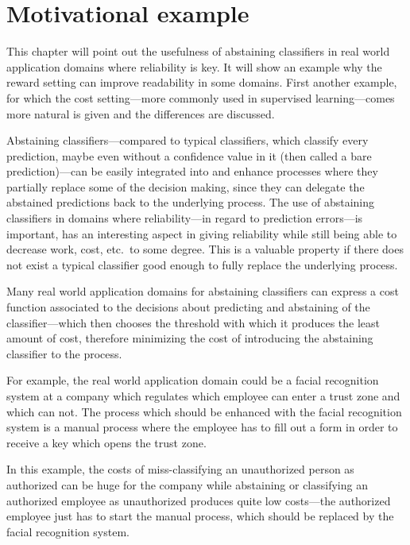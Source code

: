 \documentclass[twoside,11pt]{article}
\begin{document}
\section{Motivational example}
\label{sec:example}

This chapter will point out the usefulness of abstaining
classifiers in real world application domains where
reliability is key.
It will show an example why the reward setting can improve
readability in some domains.
First another example, for which the cost setting---more
commonly used in supervised learning---comes more natural
is given and the differences are discussed.

Abstaining classifiers---compared to typical classifiers,
which classify every prediction, maybe even without a
confidence value in it (then called a bare
prediction)---can be easily integrated into and enhance
processes where they partially replace some of the decision
making, since they can delegate the abstained predictions
back to the underlying process.
The use of abstaining classifiers in domains where
reliability---in regard to prediction errors---is
important, has an interesting aspect in giving
reliability while still being able to decrease work, cost,
etc.\ to some degree.
This is a valuable property if there does not exist a
typical classifier good enough to fully replace the
underlying process.

Many real world application domains for abstaining
classifiers can express a cost function associated to the
decisions about predicting and abstaining of the
classifier---which then chooses the threshold with which it
produces the least amount of cost, therefore minimizing
the cost of introducing the abstaining classifier to the
process.

For example, the real world application domain could be a
facial recognition system at a company which regulates
which employee can enter a trust zone and which can not.
The process which should be enhanced with the facial
recognition system is a manual process where the employee
has to fill out a form in order to receive a key which
opens the trust zone.

In this example, the costs of miss-classifying an
unauthorized person as authorized can be huge for
the company while abstaining or classifying an authorized
employee as unauthorized produces quite low costs---the
authorized employee just has to start the manual process,
which should be replaced by the facial recognition system.
\end{document}
